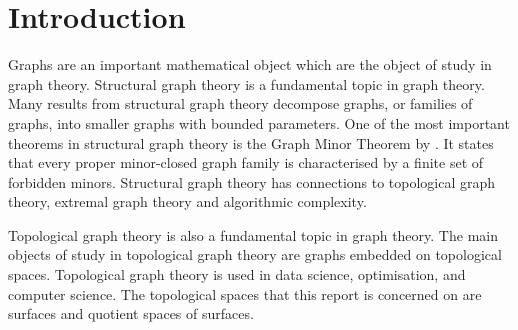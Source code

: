\chapter{Introduction}\label{sec:introduction}
Graphs are an important mathematical object which are the object of study in graph theory. 
Structural graph theory is a fundamental topic in graph theory. Many results from structural graph theory decompose graphs, or families of graphs, into smaller graphs with bounded parameters. One of the most important theorems in structural graph theory is the Graph Minor Theorem by \textcite{robertsonGraphMinorsXX2004}. It states that every proper minor-closed graph family is characterised by a finite set of forbidden minors. Structural graph theory has connections to topological graph theory, extremal graph theory and algorithmic complexity. 

Topological graph theory is also a fundamental topic in graph theory. The main objects of study in topological graph theory are graphs embedded on topological spaces. Topological graph theory is used in data science, optimisation, and computer science. The topological spaces that this report is concerned on are surfaces and quotient spaces of surfaces. 






%

%

%

